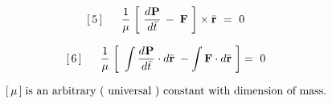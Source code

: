\documentclass[10pt,fleqn]{article}
\begin{document}
\par \vspace{+0.15em}
\begin{eqnarray*}
\hspace{+1.26em} [\,5\,] \;\;\;\;\;\; \dfrac{1}{\mu} \; \bigg [ \,\, \dfrac{d\hspace{+0.045em}\mathbf{P}}{d\bar{t}} \, - \; \mathbf{F} \,\, \bigg ] \times \bar{\mathbf{r}} ~=~ 0
\end{eqnarray*}
\par \vspace{+0.15em}
\begin{eqnarray*}
\hspace{+1.26em} [\,6\,] \;\;\;\;\;\; \dfrac{1}{\mu} \; \bigg [ \,\, \int \dfrac{d\hspace{+0.045em}\mathbf{P}}{d\bar{t}} \cdot d\bar{\mathbf{r}} \; - \int \mathbf{F} \cdot d\bar{\mathbf{r}} \,\, \bigg ] =~ 0
\end{eqnarray*}
\par \vspace{+0.33em}
\begin{eqnarray*}
\hspace{+1.26em} [\,\mu\,] \; \textrm{is an arbitrary ( universal ) constant with dimension of mass.}
\end{eqnarray*}

\newpage

\par {}

\smallskip

\par {}

\bigskip \bigskip
\end{document}
